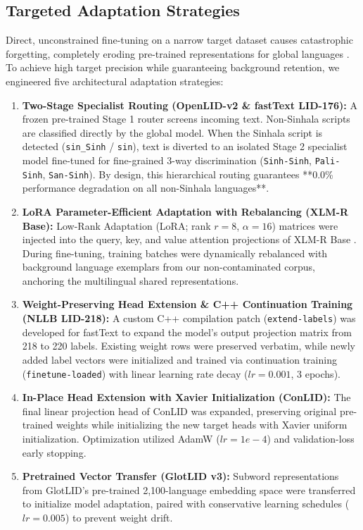 \documentclass[11pt]{article}
\begin{document}
\subsection{Targeted Adaptation Strategies}
Direct, unconstrained fine-tuning on a narrow target dataset causes catastrophic forgetting, completely eroding pre-trained representations for global languages \cite{mccloskey1989catastrophic,french1999catastrophic,kirkpatrick2017overcoming}. To achieve high target precision while guaranteeing background retention, we engineered five architectural adaptation strategies:
\begin{enumerate}
    \item \textbf{Two-Stage Specialist Routing (OpenLID-v2 \& fastText LID-176):} A frozen pre-trained Stage 1 router screens incoming text. Non-Sinhala scripts are classified directly by the global model. When the Sinhala script is detected (\texttt{sin\_Sinh} / \texttt{sin}), text is diverted to an isolated Stage 2 specialist model fine-tuned for fine-grained 3-way discrimination (\texttt{Sinh-Sinh}, \texttt{Pali-Sinh}, \texttt{San-Sinh}). By design, this hierarchical routing guarantees **0.0\% performance degradation on all non-Sinhala languages**.
    \item \textbf{LoRA Parameter-Efficient Adaptation with Rebalancing (XLM-R Base):} Low-Rank Adaptation (LoRA; rank $r=8$, $\alpha=16$) matrices were injected into the query, key, and value attention projections of XLM-R Base \cite{hu2022lora}. During fine-tuning, training batches were dynamically rebalanced with background language exemplars from our non-contaminated corpus, anchoring the multilingual shared representations.
    \item \textbf{Weight-Preserving Head Extension \& C++ Continuation Training (NLLB LID-218):} A custom C++ compilation patch (\texttt{extend-labels}) was developed for fastText to expand the model's output projection matrix from 218 to 220 labels. Existing weight rows were preserved verbatim, while newly added label vectors were initialized and trained via continuation training (\texttt{finetune-loaded}) with linear learning rate decay ($lr=0.001$, 3 epochs).
    \item \textbf{In-Place Head Extension with Xavier Initialization (ConLID):} The final linear projection head of ConLID was expanded, preserving original pre-trained weights while initializing the new target heads with Xavier uniform initialization. Optimization utilized AdamW ($lr=1e-4$) and validation-loss early stopping.
    \item \textbf{Pretrained Vector Transfer (GlotLID v3):} Subword representations from GlotLID's pre-trained 2,100-language embedding space were transferred to initialize model adaptation, paired with conservative learning schedules ($lr=0.005$) to prevent weight drift.
\end{enumerate}
\end{document}
